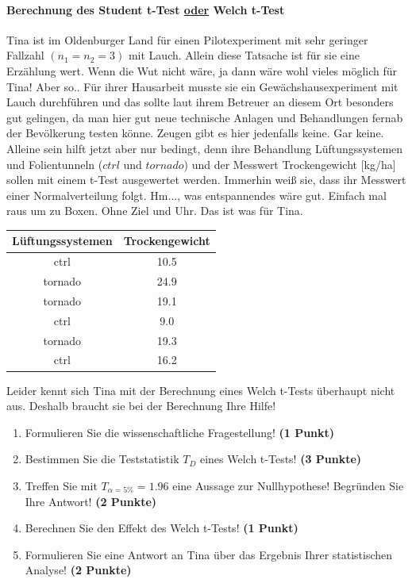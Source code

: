 \documentclass[a4paper, 9pt]{scrartcl}\usepackage[]{graphicx}\usepackage[]{xcolor}
\begin{document}
\ifcollection
\paragraph{Berechnung des Student t-Test \underline{oder} Welch t-Test}
\fi

Tina ist im Oldenburger Land für einen Pilotexperiment mit sehr geringer Fallzahl $(n_1 = n_2 = 3)$ mit Lauch. Allein diese Tatsache ist für sie eine Erzählung wert. Wenn die Wut nicht wäre, ja dann wäre wohl vieles möglich für Tina! Aber so..  Für ihrer Hausarbeit musste sie ein Gewächshausexperiment mit Lauch durchführen und das sollte laut ihrem Betreuer an diesem Ort besonders gut gelingen, da man hier gut neue technische Anlagen und Behandlungen fernab der Bevölkerung testen könne. Zeugen gibt es hier jedenfalls keine. Gar keine.  Alleine sein hilft jetzt aber nur bedingt, denn ihre Behandlung Lüftungssystemen und Folientunneln ($ctrl$ und $tornado$) und der Messwert Trockengewicht [kg/ha] sollen mit einem t-Test ausgewertet werden. Immerhin weiß sie, dass ihr Messwert einer Normalverteilung folgt. Hm..., was entspannendes wäre gut. Einfach mal raus um zu Boxen. Ohne Ziel und Uhr. Das ist was für Tina.

\begin{table}[!h]
\centering
\begin{tabular}{cc}
\toprule
Lüftungssystemen & Trockengewicht\\
\midrule
ctrl & 10.5\\
tornado & 24.9\\
tornado & 19.1\\
ctrl & 9.0\\
tornado & 19.3\\
\addlinespace
ctrl & 16.2\\
\bottomrule
\end{tabular}
\end{table}



Leider kennt sich Tina mit der Berechnung eines Welch t-Tests überhaupt nicht aus. Deshalb braucht sie bei der Berechnung Ihre Hilfe!

\begin{enumerate}
  \item Formulieren Sie die wissenschaftliche Fragestellung! \textbf{(1 Punkt)}
  \item Bestimmen Sie die Teststatistik $T_{D}$ eines Welch t-Tests! \textbf{(3 Punkte)}
  \item Treffen Sie mit $T_{\alpha = 5\%} = 1.96$ eine Aussage zur Nullhypothese! Begründen Sie Ihre Antwort! \textbf{(2 Punkte)}
  \item Berechnen Sie den Effekt des Welch t-Tests! \textbf{(1 Punkt)}
  \item Formulieren Sie eine Antwort an Tina über das Ergebnis Ihrer statistischen Analyse! \textbf{(2 Punkte)}
\end{enumerate} 
\clearpage
\end{document}
